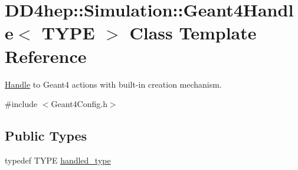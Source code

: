 \hypertarget{class_d_d4hep_1_1_simulation_1_1_geant4_handle}{}\section{D\+D4hep\+:\+:Simulation\+:\+:Geant4\+Handle$<$ T\+Y\+PE $>$ Class Template Reference}
\label{class_d_d4hep_1_1_simulation_1_1_geant4_handle}


\hyperlink{class_d_d4hep_1_1_handle}{Handle} to Geant4 actions with built-\/in creation mechanism.  




{\ttfamily \#include $<$Geant4\+Config.\+h$>$}

\subsection*{Public Types}
\begin{DoxyCompactItemize}
\item 
typedef T\+Y\+PE \hyperlink{class_d_d4hep_1_1_simulation_1_1_geant4_handle_a35e583b9228e38c95d23112ad19b645d}{handled\+\_\+type}
\end{DoxyCompactItemize}
